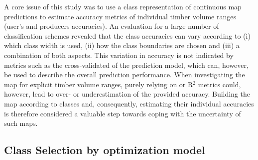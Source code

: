 A core issue of this study was to use a class representation of continuous map predictions to estimate accuracy metrics of individual timber volume ranges (user's and producers accuracies). An evaluation for a large number of classification schemes revealed that the class accuracies can vary according to (i) which class width is used, (ii) how the class boundaries are chosen and (iii) a combination of both aspects. This variation in accuracy is not indicated by metrics such as the cross-validated \rmsecv{} of the prediction model, which can, however, be used to describe the overall prediction performance. When investigating the map for explicit timber volume ranges, purely relying on \rmsecv{} or R$^2$ metrics could, however, lead to over- or underestimation of the provided accuracy. Building the map according to classes and, consequently, estimating their individual accuracies is therefore considered a valuable step towards coping with the uncertainty of such maps.

\subsection{Class Selection by optimization model}
\label{sec:cspmod}

